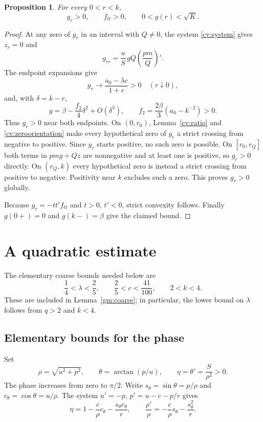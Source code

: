 \documentclass[11pt,letterpaper,reqno]{amsart}
\newtheorem{proposition}[theorem]{Proposition}
\theoremstyle{definition}
\begin{document}
\begin{proposition}
For every $0<r<k$,
\[
 g_r>0,\qquad f_{tt}>0,\qquad 0<g(r)<\sqrt K.
\]
\end{proposition}
\begin{proof}
At any zero of $g_r$ in an interval with $Q\ne0$, the system
\eqref{cv:system} gives $z_r=0$ and
\begin{equation}\label{cv:zeroorientation}
 g_{rr}=\frac{u}{S}\,gQ\left(\frac{pm}{Q}\right)'.
\end{equation}
The endpoint expansions give
\[
 g_r\longrightarrow\frac{a_0-\lambda c}{1+c}>0\quad(r\downarrow0),
\]
and, with $\delta=k-r$,
\[
 g=\beta-\frac{f_2}4\delta^2+O(\delta^3),\qquad
 f_2=\frac{2\beta}{3}(a_0-k^{-2})>0.
\]
Thus $g_r>0$ near both endpoints. On $(0,r_0)$, Lemma~\ref{cv:ratio}
and \eqref{cv:zeroorientation} make every hypothetical zero of $g_r$
a strict crossing from negative to positive. Since $g_r$ starts
positive, no such zero is possible. On $[r_0,r_Q]$ both terms in
$pmg+Qz$ are nonnegative and at least one is positive, so $g_r>0$
directly. On $(r_Q,k)$ every hypothetical zero is instead a strict
crossing from positive to negative. Positivity near $k$ excludes
such a zero. This proves $g_r>0$ globally.

Because $g_r=-t t'f_{tt}$ and $t>0$, $t'<0$, strict convexity
follows. Finally $g(0+)=0$ and $g(k-)=\beta$ give the claimed
bound.
\end{proof}

\section{A quadratic estimate}
The elementary coarse bounds needed below are
\begin{equation}
 \frac14<\lambda<\frac25,\qquad
 \frac25<c<\frac{41}{100},\qquad 2<k<4.
\end{equation}
These are included in Lemma~\ref{gm:coarse}; in particular, the lower
bound on $\lambda$ follows from $q>2$ and $k<4$.

\subsection{Elementary bounds for the phase}
Set
\[
 \rho=\sqrt{u^2+p^2},\qquad \theta=\arctan(p/u),\qquad
 \eta=\theta'=\frac{S}{\rho^2}>0.
\]
The phase increases from zero to $\pi/2$. Write $s_\theta=\sin\theta=p/\rho$
and $c_\theta=\cos\theta=u/\rho$. The system
$u'=-p$, $p'=u-c-p/r$ gives
\begin{equation}\label{ph:phase}
 \eta=1-\frac{c}{\rho} c_\theta-\frac{s_\theta c_\theta}{r},\qquad
 \frac{\rho'}\rho=-\frac{c}{\rho} s_\theta-\frac{s_\theta^2}{r}.
\end{equation}
\end{document}
